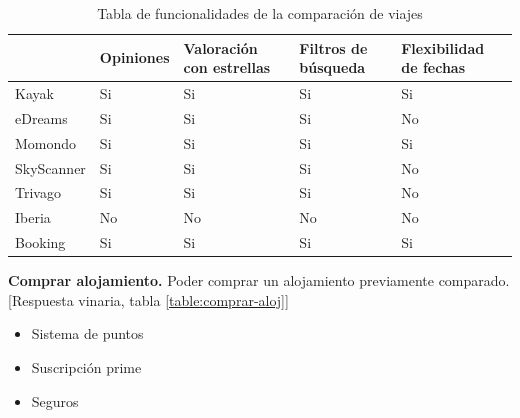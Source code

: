 \begin{table}[H]
    \centering
    \begin{tabular}{l|l|l|l|l|}
    \cline{2-5}
                                     & Opiniones & Valoración con estrellas & Filtros de búsqueda & Flexibilidad de fechas \\ \hline
    \multicolumn{1}{|l|}{Kayak}      & Si        & Si                       & Si                  & Si                     \\ \hline
    \multicolumn{1}{|l|}{eDreams}    & Si        & Si                       & Si                  & No                     \\ \hline
    \multicolumn{1}{|l|}{Momondo}    & Si        & Si                       & Si                  & Si                     \\ \hline
    \multicolumn{1}{|l|}{SkyScanner} & Si        & Si                       & Si                  & No                     \\ \hline
    \multicolumn{1}{|l|}{Trivago}    & Si        & Si                       & Si                  & No                     \\ \hline
    \multicolumn{1}{|l|}{Iberia}     & No        & No                       & No                  & No                     \\ \hline
    \multicolumn{1}{|l|}{Booking}    & Si        & Si                       & Si                  & Si                     \\ \hline
    \end{tabular}
    \caption{Tabla de funcionalidades de la comparación de viajes}
    \label{table:comp-aloj}
    \end{table}

\textbf{Comprar alojamiento.} Poder comprar un alojamiento previamente comparado. [Respuesta vinaria, tabla \ref{table:comprar-aloj}]

\begin{itemize}
    \item Sistema de puntos 
    \item Suscripción prime 
    \item Seguros
\end{itemize}

